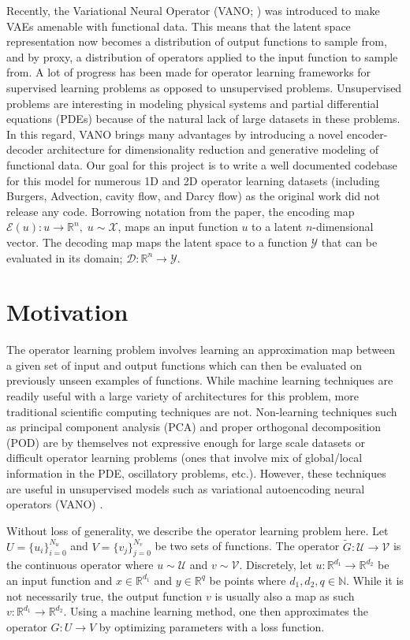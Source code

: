 \documentclass[11pt, fullpage,letterpaper]{article}
\begin{document}
Recently, the Variational Neural Operator (VANO; \cite{seidman2023variational}) was introduced to make VAEs amenable with functional data. This means that the latent space representation now becomes a distribution of output functions to sample from, and by proxy, a distribution of operators applied to the input function to sample from. A lot of progress has been made for operator learning frameworks for supervised learning problems as opposed to unsupervised problems. Unsupervised problems are interesting in modeling physical systems and partial differential equations (PDEs) because of the natural lack of large datasets in these problems. In this regard, VANO brings many advantages by introducing a novel encoder-decoder architecture for dimensionality reduction and generative modeling of functional data. Our goal for this project is to write a well documented codebase for this model for numerous 1D and 2D operator learning datasets (including Burgers, Advection, cavity flow, and Darcy flow) as the original work did not release any code. Borrowing notation from the paper, the encoding map $\mathcal{E}(u): u \rightarrow \mathbb{R}^n, \; u \sim \mathcal{X}$, maps an input function $u$ to a latent $n$-dimensional vector. The decoding map maps the latent space to a function $\mathcal{Y}$ that can be evaluated in its domain; $\mathcal{D}: \mathbb{R}^n \rightarrow \mathcal{Y}$.

\section{Motivation}
The operator learning problem involves learning an approximation map between a given set of input and output functions \cite{Lu_2021, fair_paper} which can then be evaluated on previously unseen examples of functions. While machine learning techniques are readily useful with a large variety of architectures for this problem, more traditional scientific computing techniques are not. Non-learning techniques such as principal component analysis (PCA) and proper orthogonal decomposition (POD) are by themselves not expressive enough for large scale datasets or difficult operator learning problems (ones that involve mix of global/local information in the PDE, oscillatory problems, etc.). However, these techniques are useful in unsupervised models such as variational autoencoding neural operators (VANO) \cite{seidman2023variational}.

Without loss of generality, we describe the operator learning problem here. Let $U=\{u_i\}_{i=0}^{N_u}$ and $V=\{v_j\}_{j=0}^{N_v}$ be two sets of functions. The operator $\tilde{G}: \mathcal{U} \rightarrow \mathcal{V}$ is the continuous operator where $u \sim \mathcal{U}$ and $v \sim \mathcal{V}$. Discretely, let $u: \mathbb{R}^{d_1} \rightarrow \mathbb{R}^{d_2}$ be an input function and $x \in \mathbb{R}^{d_1}$ and $y \in \mathbb{R}^{q}$ be points where $d_{1}, d_2, q \in \mathbb{N}$. While it is not necessarily true, the output function $v$ is usually also a map as such $v: \mathbb{R}^{d_1} \rightarrow \mathbb{R}^{d_2}$. Using a machine learning method, one then approximates the operator $G: U \rightarrow V$ by optimizing parameters with a loss function.
\end{document}
